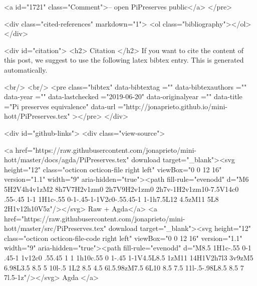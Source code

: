 <a id="1721" class="Comment">-- open PiPreserves public</a>
</pre>


  <div class="cited-references" markdown="1">
  <ol class="bibliography"></ol>
  </div>


  
  <div id="citation">
  <h2> Citation </h2>
  If you want to cite the content of this post,
  we suggest to use the following latex bibtex entry.
  This is generated automatically.

  <br/>
  <br/>
  <pre class="bibtex"
       data-bibtextag =""
       data-bibtexauthors =""
       data-year =""
       data-lastchecked ="2019-06-20"
       data-originalyear =""
       data-title ="Pi preserves equivalence"
       data-url ="http://jonaprieto.github.io/mini-hott/PiPreserves.tex"
  ></pre>
  </div>
  

  <div id="github-links">
    <div class="view-source">
      
        <a href="https://raw.githubusercontent.com/jonaprieto/mini-hott/master/docs/agda/PiPreserves.tex" download target="_blank"><svg height="12" class="octicon octicon-file right left" viewBox="0 0 12 16" version="1.1" width="9" aria-hidden="true"><path fill-rule="evenodd" d="M6 5H2V4h4v1zM2 8h7V7H2v1zm0 2h7V9H2v1zm0 2h7v-1H2v1zm10-7.5V14c0 .55-.45 1-1 1H1c-.55 0-1-.45-1-1V2c0-.55.45-1 1-1h7.5L12 4.5zM11 5L8 2H1v12h10V5z"/></svg> Raw + Agda</a>
        <a href="https://raw.githubusercontent.com/jonaprieto/mini-hott/master/src/PiPreserves.tex" download target="_blank"><svg height="12" class="octicon octicon-file-code right left" viewBox="0 0 12 16" version="1.1" width="9" aria-hidden="true"><path fill-rule="evenodd" d="M8.5 1H1c-.55 0-1 .45-1 1v12c0 .55.45 1 1 1h10c.55 0 1-.45 1-1V4.5L8.5 1zM11 14H1V2h7l3 3v9zM5 6.98L3.5 8.5 5 10l-.5 1L2 8.5 4.5 6l.5.98zM7.5 6L10 8.5 7.5 11l-.5-.98L8.5 8.5 7 7l.5-1z"/></svg> Agda </a>
      
